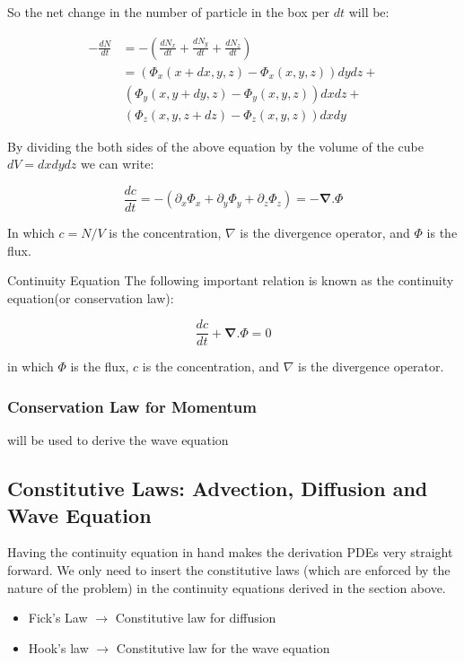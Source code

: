 So the net change in the number of particle in the box per $dt$ will be:

\begin{align*}
	-\frac{dN}{dt} &= - (\frac{dN_x}{dt} + \frac{dN_y}{dt} + \frac{dN_z}{dt}) \\
	&= (\Phi_x(x+dx,y,z)-\Phi_x(x,y,z))dydz + \\
	&\, (\Phi_y(x,y+dy,z)-\Phi_y(x,y,z)) dx dz + \\
	&\, (\Phi_z(x,y,z+dz) - \Phi_z(x,y,z)) dx dy
\end{align*}


By dividing the both sides of the above equation by the volume of the cube $ dV = dx dy dz $ we can write:

\begin{equation*}
	\frac{dc}{dt} = - (\partial_{x}\Phi_x + \partial_{y}\Phi_y + \partial_{z}\Phi_z) = -\mathbf{\nabla} . \Phi
\end{equation*}

In which $c = N/V$ is the concentration, $ \nabla $ is the divergence operator, and $ \Phi $ is the flux. 

\begin{definition}{Continuity Equation}
	The following important relation is known as the continuity equation(or conservation law):
	
	\begin{equation}
			\frac{dc}{dt} + \mathbf{\nabla} . \Phi = 0
	\end{equation}

	in which $\Phi$ is the flux, $c$ is the concentration, and $ \nabla $ is the divergence operator.
\end{definition}


\subsubsection{Conservation Law for Momentum}
will be used to derive the wave equation


\subsection{Constitutive Laws: Advection, Diffusion and Wave Equation}

Having the continuity equation in hand makes the derivation PDEs very straight forward. We only need to insert the constitutive laws (which are enforced by the nature of the problem) in the continuity equations derived in the section above.


\begin{itemize}
	\item Fick's Law $\rightarrow$ Constitutive law for diffusion 
	\item Hook's law $\rightarrow$ Constitutive law for the wave equation
\end{itemize}



